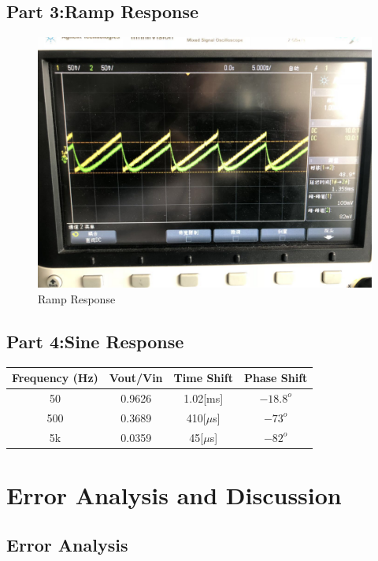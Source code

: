 \documentclass[12pt]{article}
\begin{document}
\subsection{Part 3:Ramp Response}
\begin{figure}[H]
\centering
\includegraphics[scale=0.2]{p5.jpg}
\caption{Ramp Response}
\end{figure}
\subsection{Part 4:Sine Response}
\begin{table}[H]
\centering
\begin{tabular}{|c|c|c|c|}
\hline
Frequency (Hz) & Vout/Vin & Time Shift & Phase Shift \\ \hline
50             &0.9626          &1.02[ms]            &$-18.8^o$             \\ \hline
500            &0.3689          &410[$\mu$s]            & $-73^o$            \\ \hline
5k             &0.0359          &45[$\mu$s]            & $-82^o$            \\ \hline
\end{tabular}
\end{table}
\section{Error Analysis and Discussion}
\subsection{Error Analysis}
\end{document}
